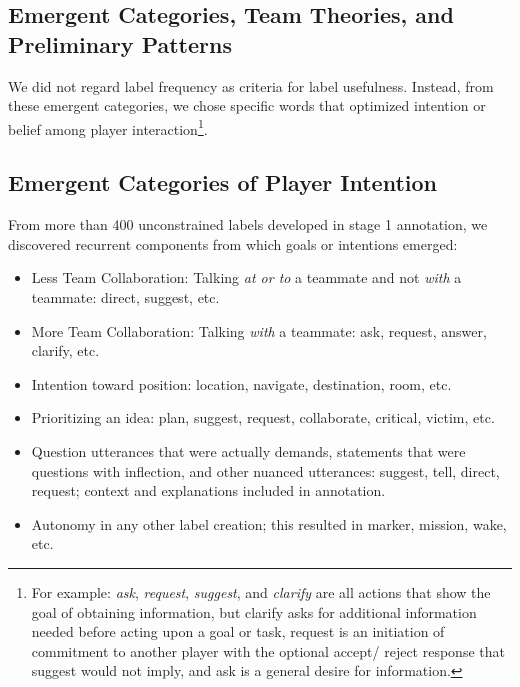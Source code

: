 \documentclass[10pt]{article}
\begin{document}
\subsection{Emergent Categories, Team Theories, and Preliminary Patterns}

We did not regard label frequency as criteria for label usefulness. Instead, from these emergent categories, we chose specific words that optimized intention or belief among player interaction\footnote{For example: \emph{ask}, \emph{request}, \emph{suggest}, and \emph{clarify} are all actions that show the goal of obtaining information, but clarify asks for additional information needed before acting upon a goal or task, request is an initiation of commitment to another player with the optional accept/ reject response that suggest would not imply, and ask is a general desire for information.}. 








 
















\subsection{Emergent Categories of Player Intention}
From more than 400 unconstrained labels developed in stage 1 annotation, we discovered recurrent components from which goals or intentions emerged:

\begin{itemize}
    \item Less Team Collaboration: Talking \emph{at or to} a teammate and not \emph{with} a teammate: direct, suggest, etc.
    \item More Team Collaboration: Talking \emph{with} a teammate: ask, request, answer, clarify, etc.
    \item Intention toward position: location, navigate, destination, room, etc.
    \item Prioritizing an idea: plan, suggest, request, collaborate, critical, victim, etc.
    \item Question utterances that were actually demands, statements that were questions with inflection, and other nuanced utterances: suggest, tell, direct, request; context and explanations included in annotation.
    \item Autonomy in any other label creation; this resulted in marker, mission, wake, etc.
\end{itemize}
\end{document}

